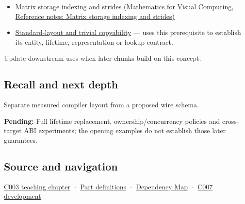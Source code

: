 \begin{itemize}
\item
  \href{../02-Mathematics-for-Visual-Computing/main.pdf\#nameddest=appendix-ffdc1d4e5350}{Matrix storage indexing and strides (Mathematics for Visual Computing, Reference notes: Matrix storage indexing and strides)}
\item
  \hyperref[appendix-958870a64c53]{Standard-layout and trivial copyability} --- uses this prerequisite to establish its entity, lifetime, representation or lookup contract.
\end{itemize}

Update downstream uses when later chunks build on this concept.

\subsection{Recall and next depth}\label{appendix-c4ac6bb0fff8-recall-and-next-depth}

Separate measured compiler layout from a proposed wire schema.

\textbf{Pending:} Full lifetime replacement, ownership/concurrency policies and cross-target ABI experiments; the opening examples do not establish those later guarantees.

\subsection{Source and navigation}\label{appendix-c4ac6bb0fff8-source-and-navigation}

\hyperref[01-foundations-i-ch002-where-the-bytes-live]{C003 teaching chapter} · \hyperref[appendix-fd090d982a15-m003---parts-41-60]{Part definitions} · \hyperref[appendix-4ad47bdd269a]{Dependency Map} · \hyperref[01-foundations-i-ch003-bringing-the-object-model-back-to-bytes]{C007 development}
